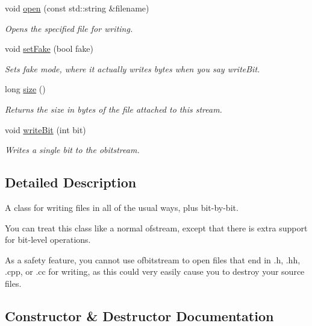 \begin{DoxyCompactItemize}
void \mbox{\hyperlink{classofbitstream_a72f6f3d1b9bc5a4275359cc0a83a60bd}{open}} (const std\+::string \&filename)
\begin{DoxyCompactList}\small\item\em Opens the specified file for writing. \end{DoxyCompactList}\item 
void \mbox{\hyperlink{classobitstream_ad916b4624eb09d375514964f867b475c}{set\+Fake}} (bool fake)
\begin{DoxyCompactList}\small\item\em Sets \textquotesingle{}fake\textquotesingle{} mode, where it actually writes bytes when you say write\+Bit. \end{DoxyCompactList}\item 
long \mbox{\hyperlink{classobitstream_a22727e9c338fb1aaa6722031445373c3}{size}} ()
\begin{DoxyCompactList}\small\item\em Returns the size in bytes of the file attached to this stream. \end{DoxyCompactList}\item 
void \mbox{\hyperlink{classobitstream_a487c88ba2560a4657d18c3edb7d9d247}{write\+Bit}} (int bit)
\begin{DoxyCompactList}\small\item\em Writes a single bit to the obitstream. \end{DoxyCompactList}\end{DoxyCompactItemize}


\subsection{Detailed Description}
A class for writing files in all of the usual ways, plus bit-\/by-\/bit. 

You can treat this class like a normal ofstream, except that there is extra support for bit-\/level operations.

As a safety feature, you cannot use ofbitstream to open files that end in .h, .hh, .cpp, or .cc for writing, as this could very easily cause you to destroy your source files. 

\subsection{Constructor \& Destructor Documentation}
\mbox{\label{classofbitstream_a17657aa7e766554cdfd08cbed37d02e4}} 
